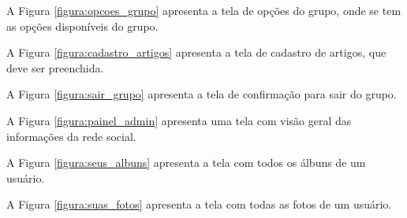 A Figura \ref{figura:opcoes_grupo} apresenta a tela de opções do grupo, onde se tem as opções disponíveis do grupo.


A Figura \ref{figura:cadastro_artigos} apresenta a tela de cadastro de artigos, que deve ser preenchida.


A Figura \ref{figura:sair_grupo} apresenta a tela de confirmação para sair do grupo.


A Figura \ref{figura:painel_admin} apresenta uma tela com visão geral das informações da rede social.


A Figura \ref{figura:seus_albuns} apresenta a tela com todos os álbuns de um usuário.


A Figura \ref{figura:suas_fotos} apresenta a tela com todas as fotos de um usuário.


